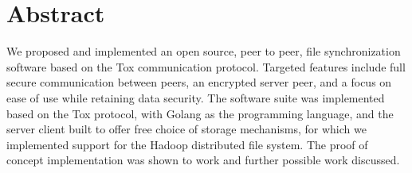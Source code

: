 \section*{Abstract}
\label{chap:abstract}

We proposed and implemented an open source, peer to peer, file synchronization software based on the Tox communication protocol.
Targeted features include full secure communication between peers, an encrypted server peer, and a focus on ease of use while retaining data security.
The software suite was implemented based on the Tox protocol, with Golang as the programming language, and the server client built to offer free choice of storage mechanisms, for which we implemented support for the Hadoop distributed file system.
The proof of concept implementation was shown to work and further possible work discussed.
